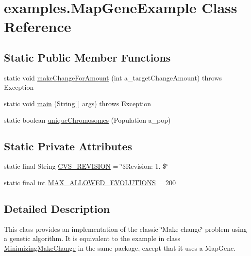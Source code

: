 \hypertarget{classexamples_1_1_map_gene_example}{\section{examples.\-Map\-Gene\-Example Class Reference}
\label{classexamples_1_1_map_gene_example}
}
\subsection*{Static Public Member Functions}
\begin{DoxyCompactItemize}
\item 
static void \hyperlink{classexamples_1_1_map_gene_example_a166e10f6a754c026cb499be231f8f9a0}{make\-Change\-For\-Amount} (int a\-\_\-target\-Change\-Amount)  throws Exception 
\item 
static void \hyperlink{classexamples_1_1_map_gene_example_a6d9bbe7446f68761b3008d464c50a7d6}{main} (String\mbox{[}$\,$\mbox{]} args)  throws Exception 
\item 
static boolean \hyperlink{classexamples_1_1_map_gene_example_af459ec18838a6bd52544e025ebfa78ef}{unique\-Chromosomes} (Population a\-\_\-pop)
\end{DoxyCompactItemize}
\subsection*{Static Private Attributes}
\begin{DoxyCompactItemize}
\item 
static final String \hyperlink{classexamples_1_1_map_gene_example_ab71e91c9712991e9009775da2ab9d09f}{C\-V\-S\-\_\-\-R\-E\-V\-I\-S\-I\-O\-N} = \char`\"{}\$Revision\-: 1. \$\char`\"{}
\item 
static final int \hyperlink{classexamples_1_1_map_gene_example_a7504a010ffefd4d9df37d3e8c96b0c1a}{M\-A\-X\-\_\-\-A\-L\-L\-O\-W\-E\-D\-\_\-\-E\-V\-O\-L\-U\-T\-I\-O\-N\-S} = 200
\end{DoxyCompactItemize}


\subsection{Detailed Description}
This class provides an implementation of the classic \char`\"{}\-Make change\char`\"{} problem using a genetic algorithm. It is equivalent to the example in class \hyperlink{classexamples_1_1_minimizing_make_change}{Minimizing\-Make\-Change} in the same package, except that it uses a Map\-Gene.

